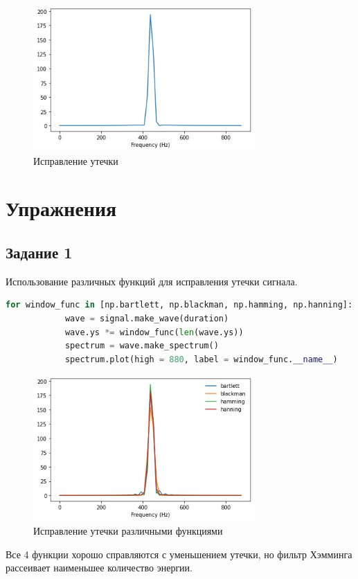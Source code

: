 \documentclass[a4paper, 12pt]{report}
\begin{document}
	\begin{figure}[H]
		\centering
		\includegraphics[width=0.75\textwidth]{leak3.png}
		\caption{Исправление утечки}
		\label{fig:leak3}
	\end{figure}

	\chapter{Упражнения}
	\section{Задание 1}
	Использование различных функций для исправления утечки сигнала.
	\begin{lstlisting}[language=Python,caption=Борьба с утечкой]
		for window_func in [np.bartlett, np.blackman, np.hamming, np.hanning]:
			wave = signal.make_wave(duration)
			wave.ys *= window_func(len(wave.ys))
			spectrum = wave.make_spectrum()
			spectrum.plot(high = 880, label = window_func.__name__)
	\end{lstlisting}
	\begin{figure}[H]
		\centering
		\includegraphics[width=0.75\textwidth]{leak4.png}
		\caption{Исправление утечки различными функциями}
		\label{fig:leak4}
	\end{figure}
	Все 4 функции хорошо справляются с уменьшением утечки, но фильтр Хэмминга рассеивает наименьшее количество энергии.
\end{document}
